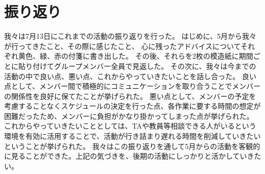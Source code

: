 \chapter{振り返り}
我々は7月13日にこれまでの活動の振り返りを行った。
はじめに、5月から我々が行ってきたこと、その際に感じたこと、
心に残ったアドバイスについてそれぞれ黄色、緑、赤の付箋に書き出した。
その後、それらを2枚の模造紙に期間ごとに貼り付けてグループメンバー全員で見返した。
その次に、我々は今までの活動の中で良い点、悪い点、これからやっていきたいことを話し合った。
良い点として、メンバー間で積極的にコミュニケーションを取り合うことでメンバーの関係性を良好に保てたことが挙げられた。
悪い点として、メンバーの予定を考慮することなくスケジュールの決定を行った点、各作業に要する時間の想定が困難だったため、メンバーに負担がかなり掛かってしまった点が挙げられた。
これからやっていきたいこととしては、TAや教員等相談できる人がいるという環境を有効に活用することで、活動が行き詰まり遅れる時間を削減していきたいということが挙げられた。
我々はこの振り返りを通して5月からの活動を客観的に見ることができた。上記の気づきを、後期の活動にしっかりと活かしていきたい。
